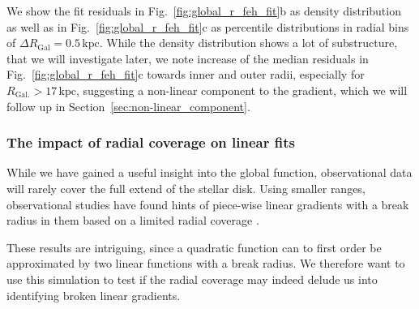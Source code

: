 \documentclass[fleqn,usenatbib]{mnras}
\begin{document}
We show the fit residuals in Fig.~\ref{fig:global_r_feh_fit}b as density distribution as well as in Fig.~\ref{fig:global_r_feh_fit}c as percentile distributions in radial bins of $\Delta R_\mathrm{Gal} = 0.5\,\mathrm{kpc}$. While the density distribution shows a lot of substructure, that we will investigate later, we note increase of the median residuals in Fig.~\ref{fig:global_r_feh_fit}c towards inner and outer radii, especially for $R_\mathrm{Gal.} > 17\,\mathrm{kpc}$, suggesting a non-linear component to the gradient, which we will follow up in Section~\ref{sec:non-linear_component}.

\subsubsection{The impact of radial coverage on linear fits}

While we have gained a useful insight into the global function, observational data will rarely cover the full extend of the stellar disk. Using smaller ranges, observational studies have found hints of piece-wise linear gradients with a break radius in them based on a limited radial coverage \citep[e.g.][]{Donor2020, Chen2023}.

These results are intriguing, since a quadratic function can to first order be approximated by two linear functions with a break radius. We therefore want to use this simulation to test if the radial coverage may indeed delude us into identifying broken linear gradients.
\end{document}
